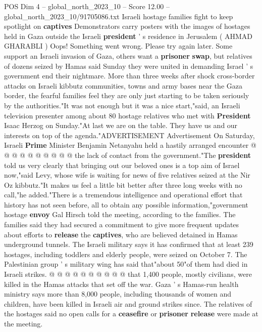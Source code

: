 \begin{textsample}{POS Dim 4 – global\_north\_2023\_10 – Score 12.00 – global\_north\_2023\_10/91705086.txt}  \label{ex:f4_pos_448}
Israeli hostage families fight to keep spotlight on \textbf{captives} Demonstrators carry posters with the images of hostages held in Gaza outside the Israeli \textbf{president} ' s residence in Jerusalem ( AHMAD GHARABLI ) Oops!
Something went wrong.
Please try again later.
Some support an Israeli invasion of Gaza, others want a \textbf{prisoner} \textbf{swap}, but relatives of dozens seized by Hamas said Sunday they were united in demanding Israel ' s government end their nightmare.
More than three weeks after shock cross-border attacks on Israeli kibbutz communities, towns and army bases near the Gaza border, the fearful families feel they are only just starting to be taken seriously by the authorities."It was not enough but it was a nice start,"said, an Israeli television presenter among about 80 hostage relatives who met with \textbf{President} Isaac Herzog on Sunday."At last we are on the table.
They have us and our interests on top of the agenda."ADVERTISEMENT Advertisement On Saturday, Israeli \textbf{Prime} Minister Benjamin Netanyahu held a hastily arranged encounter @ @ @ @ @ @ @ @ @ @ the lack of contact from the government."The \textbf{president} told us very clearly that bringing out our beloved ones is a top aim of Israel now,"said Levy, whose wife is waiting for news of five relatives seized at the Nir Oz kibbutz."It makes us feel a little bit better after three long weeks with no call,"he added."There is a tremendous intelligence and operational effort that history has not seen before, all to obtain any possible information,"government hostage \textbf{envoy} Gal Hirsch told the meeting, according to the families.
The families said they had secured a commitment to give more frequent updates about efforts to \textbf{release} the \textbf{captives}, who are believed detained in Hamas underground tunnels.
The Israeli military says it has confirmed that at least 239 hostages, including toddlers and elderly people, were seized on October 7.
The Palestinian group ' s military wing has said that"about 50"of them had died in Israeli strikes. @ @ @ @ @ @ @ @ @ @ that 1,400 people, mostly civilians, were killed in the Hamas attacks that set off the war.
Gaza ' s Hamas-run health ministry says more than 8,000 people, including thousands of women and children, have been killed in Israeli air and ground strikes since.
The relatives of the hostages said no open calls for a \textbf{ceasefire} or \textbf{prisoner} \textbf{release} were made at the meeting.

\end{textsample}
